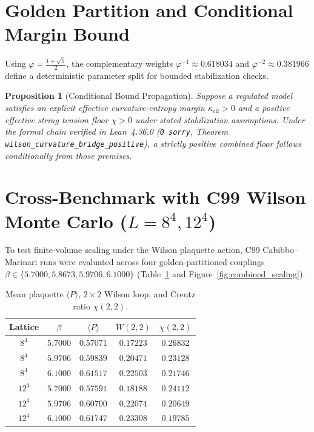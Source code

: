 \documentclass[11pt,a4paper]{article}
\newtheorem{proposition}[theorem]{Proposition}
\begin{document}
\section{Golden Partition and Conditional Margin Bound}
Using $\varphi = \frac{1+\sqrt{5}}{2}$, the complementary weights $\varphi^{-1} \approx 0.618034$ and $\varphi^{-2} \approx 0.381966$ define a deterministic parameter split for bounded stabilization checks.
\begin{proposition}[Conditional Bound Propagation]
Suppose a regulated model satisfies an explicit effective curvature-entropy margin $\kappa_{\mathrm{eff}} > 0$ and a positive effective string tension floor $\chi > 0$ under stated stabilization assumptions. Under the formal chain verified in Lean~4.36.0 (\texttt{0 sorry}, Theorem \texttt{wilson\_curvature\_bridge\_positive}), a strictly positive combined floor follows conditionally from those premises.
\end{proposition}

\section{Cross-Benchmark with C99 Wilson Monte Carlo ($L=8^4, 12^4$)}
To test finite-volume scaling under the Wilson plaquette action, C99 Cabibbo--Marinari runs were evaluated across four golden-partitioned couplings $\beta \in \{5.7000, 5.8673, 5.9706, 6.1000\}$ (Table~\ref{tab:wilson} and Figure~\ref{fig:combined_scaling}).

\begin{table}[h]
\centering
\begin{tabular}{ccccc}
\hline
Lattice & $\beta$ & $\langle P \rangle$ & $W(2,2)$ & $\chi(2,2)$ \\
\hline
$8^4$ & $5.7000$ & $0.57071$ & $0.17223$ & $0.26832$ \\
$8^4$ & $5.9706$ & $0.59839$ & $0.20471$ & $0.23128$ \\
$8^4$ & $6.1000$ & $0.61517$ & $0.22503$ & $0.21746$ \\
$12^4$ & $5.7000$ & $0.57591$ & $0.18188$ & $0.24112$ \\
$12^4$ & $5.9706$ & $0.60700$ & $0.22074$ & $0.20649$ \\
$12^4$ & $6.1000$ & $0.61747$ & $0.23308$ & $0.19785$ \\
\hline
\end{tabular}
\caption{Mean plaquette $\langle P \rangle$, $2\times 2$ Wilson loop, and Creutz ratio $\chi(2,2)$.}
\label{tab:wilson}
\end{table}
\end{document}
